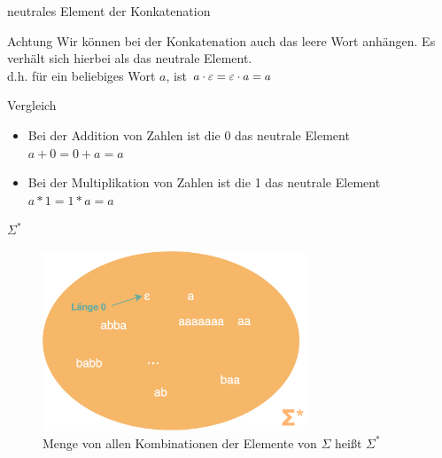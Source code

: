 \begin{frame}{neutrales Element der Konkatenation}
    \begin{alertblock}{Achtung}
        Wir können bei der Konkatenation auch das leere Wort anhängen. Es verhält sich hierbei als das neutrale Element.\\
        d.h. für ein beliebiges Wort $a$, ist $a\cdot\varepsilon = \varepsilon\cdot a=a$
        \begin{exampleblock}{Vergleich}
        \begin{itemize}
            \item Bei der Addition von Zahlen ist die 0 das neutrale Element\\
            $a+0=0+a=a$
            \item Bei der Multiplikation von Zahlen ist die 1 das neutrale Element\\
            $a*1=1*a=a$
        \end{itemize}
        
        \end{exampleblock}
    \end{alertblock}
\end{frame}


\begin{frame}[fragile]{$\Sigma^\ast$}
\begin{figure}
    \centering
    \includegraphics[width=0.7\textwidth]{../figures/SigmaSternEpsilon.png}
    \caption{Menge von allen Kombinationen der Elemente von $\Sigma$ heißt $\Sigma^\ast$}
\end{figure}
\end{frame}

